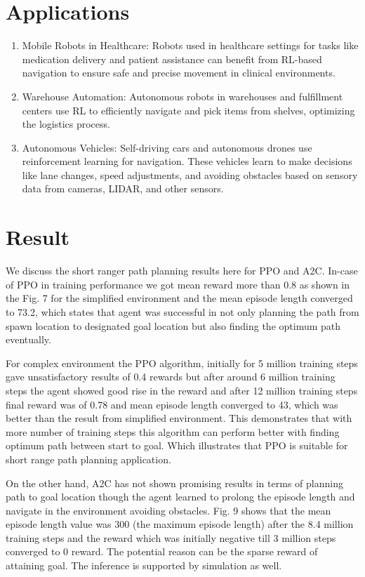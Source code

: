 \documentclass[conference]{IEEEtran}
\begin{document}
\section{Applications}

\begin{enumerate}
    \item Mobile Robots in Healthcare: Robots used in healthcare settings for tasks like medication delivery and patient assistance can benefit from RL-based navigation to ensure safe and precise movement in clinical environments.

    \item Warehouse Automation: Autonomous robots in warehouses and fulfillment centers use RL to efficiently navigate and pick items from shelves, optimizing the logistics process.

    \item Autonomous Vehicles: Self-driving cars and autonomous drones use reinforcement learning for navigation. These vehicles learn to make decisions like lane changes, speed adjustments, and avoiding obstacles based on sensory data from cameras, LIDAR, and other sensors.

\end{enumerate}

\section{Result}
We discuss the short ranger path planning results here for PPO and A2C. 
In-case of PPO in training performance we got mean reward more than 0.8 as shown in the Fig. 7 for the simplified environment and the mean episode length converged to 73.2, which states that agent was successful in not only planning the path from spawn location to designated goal location but also finding the optimum path eventually.\par
For complex environment the PPO algorithm, initially for 5 million training steps gave unsatisfactory results of 0.4 rewards but after around 6 million training steps the agent showed good rise in the reward and after 12 million training steps final reward was of 0.78 and mean episode length converged to 43, which was better than the result from simplified environment. This demonstrates that with more number of training steps this algorithm can perform better with finding optimum path between start to goal. Which illustrates that PPO is suitable for short range path planning application.\par
On the other hand, A2C has not shown promising results in terms of planning path to goal location though the agent learned to prolong the episode length and navigate in the environment avoiding obstacles. Fig. 9 shows that the mean episode length value was 300 (the maximum episode length) after the 8.4 million training steps and the reward which was initially negative till 3 million steps converged to 0 reward. The potential reason can be the sparse reward of attaining goal. The inference is supported by simulation as well.
\end{document}
